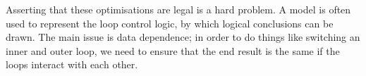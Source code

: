 Asserting that these optimisations are legal is a hard problem. A
model is often used to represent the loop control logic, by which
logical conclusions can be drawn. The main issue is data dependence;
in order to do things like switching an inner and outer loop, we need
to ensure that the end result is the same if the loops interact with
each other.


